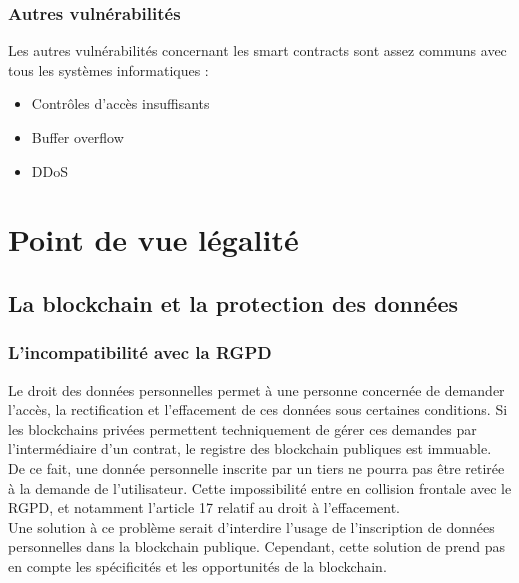 \documentclass[12pt, a4paper, oneside]{book}
\begin{document}
    \subsection{Autres vulnérabilités}

    Les autres vulnérabilités concernant les smart contracts sont assez communs avec tous les systèmes informatiques :

    \begin{itemize}
        \item Contrôles d'accès insuffisants
        \item Buffer overflow
        \item DDoS
    \end{itemize}



    \chapter{Point de vue légalité}
    \section{La blockchain et la protection des données}
    \subsection{L'incompatibilité avec la RGPD}
    Le droit des données personnelles permet 
    à une personne concernée de demander l’accès, la rectification 
    et l’effacement de ces données sous certaines conditions. 
    Si les blockchains privées permettent techniquement de gérer
    ces demandes par l’intermédiaire d’un contrat,
    le registre des blockchain publiques est immuable. De ce fait,
    une donnée personnelle inscrite par un tiers ne pourra pas être retirée 
    à la demande de l’utilisateur. Cette impossibilité entre en collision frontale avec le RGPD, 
    et notamment l’article 17 relatif au droit à l’effacement. 
    \\ 
    \newline
    Une solution à ce problème serait d'interdire l'usage de l'inscription de données personnelles dans la blockchain publique. 
    Cependant, cette solution de prend pas en compte les spécificités et les opportunités de la blockchain.
    \cite{reg}
\end{document}
